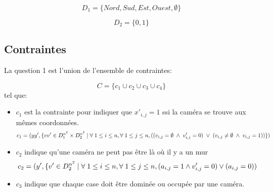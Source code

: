 \documentclass[a4paper,11pt]{article}
\begin{document}
$$D_1 = \{Nord, Sud, Est, Ouest, \emptyset\}$$

$$D_2 = \{0,1\}$$

\subsection{Contraintes}
La question 1 est l'union de l’ensemble de contraintes:

$$C = \{c_{1} \cup c_{2} \cup c_{3} \cup c_{4}\} $$
tel que:
\begin{itemize}
\item $c_{1}$ est la contrainte pour indiquer que $x'_{i,j} = 1$ ssi la caméra se trouve aux mêmes coordonnées.
  $$c_{1} = ( yy', \{ vv' \in  D_1^{n^2} \times D_2^{n^2} \mid \forall \hspace{0.1cm} 1\leq i \leq n, \forall \hspace{0.1cm} 1\leq j \leq n,
  ((v_{i,j} = \emptyset \hspace{0.1cm} \wedge \hspace{0.1cm} v'_{i,j} = 0)
   \hspace{0.1cm} \vee \hspace{0.1cm}
  (v_{i,j}  \neq \emptyset \hspace{0.1cm}\wedge \hspace{0.1cm} v_{i,j} = 1)) \} ) $$
   
\item $c_{2}$ indique qu'une caméra ne peut pas être là où il y a un mur 
  $$c_{2} = ( y', \{ v' \in D_2^{n^2} \mid \forall \hspace{0.1cm} 1\leq i \leq n, \forall \hspace{0.1cm} 1\leq j \leq n, (a_{i,j} = 1 \wedge v'_{i,j} = 0 ) \vee (a_{i,j} = 0))$$  

\item $c_{3}$ indique que chaque case doit être dominée ou occupée par une caméra.


\end{itemize}
\end{document}
